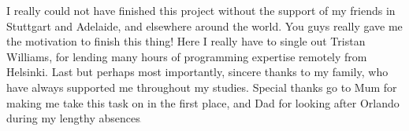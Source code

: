 I really could not have finished this project without the support of my friends in Stuttgart and Adelaide, and elsewhere around the world. You guys really gave me the motivation to finish this thing! Here I really have to single out Tristan Williams, for lending many hours of programming expertise remotely from Helsinki. Last but perhaps most importantly, sincere thanks to my family, who have always supported me throughout my studies. Special thanks go to Mum for making me take this task on in the first place, and Dad for looking after Orlando during my lengthy absences\includegraphics[height=0.5mm]{images/homer_simpson.pdf}%